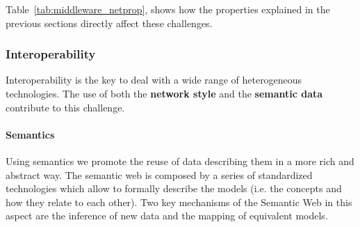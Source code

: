Table~\ref{tab:middleware_netprop}, shows how the properties explained in the previous sections directly affect these challenges.







\subsubsection{Interoperability}


Interoperability is the key to deal with a wide range of heterogeneous technologies.
The use of both the \textbf{network style} and the \textbf{semantic data} contribute to this challenge.


\paragraph{Semantics}

Using semantics we promote the reuse of data describing them in a more rich and abstract way.
The semantic web is composed by a series of standardized technologies which allow to formally describe the models (i.e. the concepts and how they relate to each other).
Two key mechanisms of the Semantic Web in this aspect are the inference of new data and the mapping of equivalent models.



